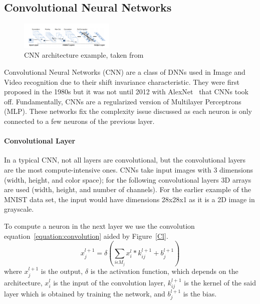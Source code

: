\documentclass[conference]{IEEEtran}
\begin{document}
\subsection{Convolutional Neural Networks}
\label{section:cnn}

 \begin{figure}[!htb]
    \centering
    \includegraphics[width=0.4\textwidth]{Figures/convolutionlayer.png}
    \caption{CNN architecture example, taken from~\cite{cgracnn}}
    \label{CNNl}
\end{figure} 

Convolutional Neural Networks (CNN) are a class of DNNs used in Image and Video
recognition due to their shift invariance characteristic. They were first
proposed in the 1980s but it was not until 2012 with AlexNet~\cite{alexnet} that
CNNs took off. Fundamentally, CNNs are a regularized version of
Multilayer Perceptrons (MLP). These networks fix the complexity issue discussed
as each neuron is only connected to a few neurons of the previous layer.


\paragraph{Convolutional Layer}
\label{section:convlayer}

In a typical CNN, not all layers are convolutional, but the convolutional layers
are the most compute-intensive ones. CNNs take input images with 3 dimensions
(width, height, and color space); for the following convolutional layers 3D
arrays are used (width, height, and number of channels). For the earlier example
of the MNIST data set, the input would have dimensions 28x28x1 as it is a 2D
image in grayscale.

To compute a neuron in the next layer we use the convolution
equation~\ref{equation:convolution} aided by Figure~\ref{Cl}.
\begin{equation} \label{equation:convolution}
    \displaystyle x_{j}^{l+1}=\delta (\sum_{i \epsilon M_{j}}x_{i}^{l} * k_{ij}^{l+1}+ b_{j}^{l+1})
\end{equation}
where $x_{j}^{l+1}$ is the output, $\delta$ is the activation function, which
depends on the architecture, $x_{i}^{l}$ is the input of the convolution layer,
$k_{ij}^{l+1}$ is the kernel of the said layer which is obtained by training the
network, and $b_{j}^{l+1}$ is the bias.
\end{document}
